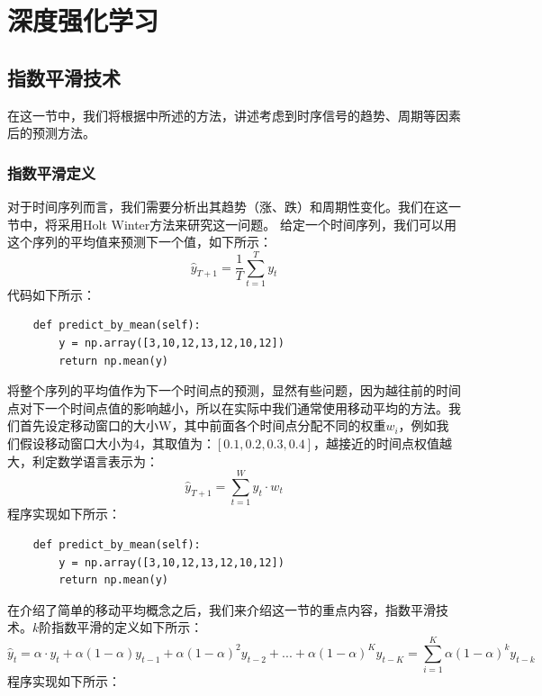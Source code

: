 \documentclass{article}
\begin{document}
\section{深度强化学习}
\subsection{指数平滑技术}
在这一节中，我们将根据\cite{r000004}中所述的方法，讲述考虑到时序信号的趋势、周期等因素后的预测方法。
\subsubsection{指数平滑定义}
对于时间序列而言，我们需要分析出其趋势（涨、跌）和周期性变化。我们在这一节中，将采用Holt Winter方法来研究这一问题。\newline
给定一个时间序列，我们可以用这个序列的平均值来预测下一个值，如下所示：
\begin{equation}
\hat{y}_{T+1}=\frac{1}{T}\sum_{t=1}^{T}y_{t}
\label{e000091}
\end{equation}
代码如下所示：
\begin{lstlisting}
    def predict_by_mean(self):
        y = np.array([3,10,12,13,12,10,12])
        return np.mean(y)
\end{lstlisting}
将整个序列的平均值作为下一个时间点的预测，显然有些问题，因为越往前的时间点对下一个时间点值的影响越小，所以在实际中我们通常使用移动平均的方法。我们首先设定移动窗口的大小W，其中前面各个时间点分配不同的权重$w_{i}$，例如我们假设移动窗口大小为4，其取值为：$[0.1, 0.2, 0.3, 0.4]$，越接近的时间点权值越大，利定数学语言表示为：
\begin{equation}
\hat{y}_{T+1}=\sum_{t=1}^{W}y_{t} \cdot w_{t}
\label{e000092}
\end{equation}
程序实现如下所示：
\begin{lstlisting}
    def predict_by_mean(self):
        y = np.array([3,10,12,13,12,10,12])
        return np.mean(y)
\end{lstlisting}
在介绍了简单的移动平均概念之后，我们来介绍这一节的重点内容，指数平滑技术。$k$阶指数平滑的定义如下所示：
\begin{equation}
\hat{y}_{t}=\alpha \cdot y_{t} + \alpha (1-\alpha) y_{t-1} + \alpha (1-\alpha)^{2}y_{t-2} + ... + \alpha (1-\alpha)^{K} y_{t-K}=\sum_{i=1}^{K}\alpha(1-\alpha)^{k} y_{t-k}
\label{e000093}
\end{equation}
程序实现如下所示：
\end{document}
